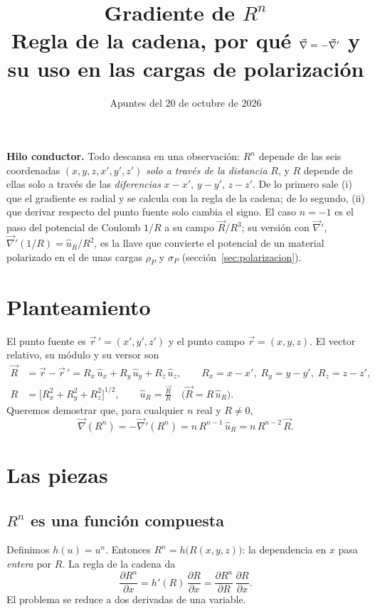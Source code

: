 \documentclass[11pt,a4paper]{article}
\title{\vspace{-1.5cm}\textbf{Gradiente de $R^{n}$}\\[4pt]
  \large\normalfont Regla de la cadena, por qué $\nab=-\nab'$ y su uso en las
  cargas de polarización}
\author{}
\date{\vspace{-0.8cm}\small Apuntes del 20 de octubre de 2026}
\numberwithin{equation}{section}
\newcommand{\vc}[1]{\vec{#1}}
\newcommand{\nab}{\vec{\nabla}}
\newcommand{\pd}[2]{\frac{\partial #1}{\partial #2}}
\newcommand{\ux}{\hat u_x}
\newcommand{\uy}{\hat u_y}
\newcommand{\uz}{\hat u_z}
\newcommand{\uR}{\hat u_R}
\begin{document}
\maketitle

\begin{hilo}
\textbf{Hilo conductor.} Todo descansa en una observación: $R^{n}$ depende de
las seis coordenadas $(x,y,z,x',y',z')$ \emph{solo a través de la distancia}
$R$, y $R$ depende de ellas solo a través de las \emph{diferencias}
$x-x'$, $y-y'$, $z-z'$. De lo primero sale (i) que el gradiente es radial y se
calcula con la regla de la cadena; de lo segundo, (ii) que derivar respecto
del punto fuente solo cambia el signo. El caso $n=-1$ es el paso del potencial
de Coulomb $1/R$ a su campo $\vc{R}/R^{3}$; su versión con $\nab'$,
$\nab'(1/R)=\uR/R^{2}$, es la llave que convierte el potencial de un material
polarizado en el de unas cargas $\rho_P$ y $\sigma_P$
(sección~\ref{sec:polarizacion}).
\end{hilo}

\section{Planteamiento}
El punto fuente es $\vc{r}\,'=(x',y',z')$ y el punto campo $\vc{r}=(x,y,z)$.
El vector relativo, su módulo y su versor son
\begin{align}
  \vc{R}&=\vc{r}-\vc{r}\,'=R_x\,\ux+R_y\,\uy+R_z\,\uz,
  \qquad R_x=x-x',\; R_y=y-y',\; R_z=z-z', \label{eq:Rvec}\\
  R&=\bigl[R_x^{2}+R_y^{2}+R_z^{2}\bigr]^{1/2},\qquad
  \uR=\frac{\vc{R}}{R}\quad\bigl(\vc{R}=R\,\uR\bigr). \label{eq:Rmod}
\end{align}
Queremos demostrar que, para cualquier $n$ real y $R\neq0$,
\begin{equation}\label{eq:objetivo}
  \nab(R^{n})=-\nab'(R^{n})=n\,R^{n-1}\,\uR=n\,R^{n-2}\,\vc{R}.
\end{equation}

\section{Las piezas}
\subsection{$R^{n}$ es una función compuesta}
Definimos $h(u)=u^{n}$. Entonces $R^{n}=h\bigl(R(x,y,z)\bigr)$: la dependencia
en $x$ pasa \emph{entera} por $R$. La regla de la cadena da
\begin{equation}\label{eq:cadena}
  \pd{R^{n}}{x}=h'(R)\,\pd{R}{x}=\pd{R^{n}}{R}\,\pd{R}{x}.
\end{equation}
El problema se reduce a dos derivadas de una variable.
\end{document}
